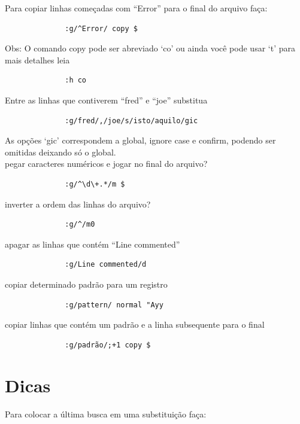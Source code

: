 \documentclass[10pt,a4paper,openany]{book}
\begin{document}
Para copiar linhas começadas com ``Error'' para o final do arquivo faça:

\begin{verbatim}
			  :g/^Error/ copy $
\end{verbatim}

Obs: O comando copy pode ser abreviado `co' ou ainda você pode usar `t'
para mais detalhes leia

\begin{verbatim}
			  :h co
\end{verbatim}

Entre as linhas que contiverem ``fred'' e ``joe'' substitua

\begin{verbatim}
			  :g/fred/,/joe/s/isto/aquilo/gic
\end{verbatim}

As opções `gic' correspondem a global, ignore case e confirm, podendo ser
omitidas deixando só o global. \\


pegar caracteres numéricos e jogar no final do arquivo?

\begin{verbatim}
			  :g/^\d\+.*/m $
\end{verbatim}

inverter a ordem das linhas do arquivo?

\begin{verbatim}
			  :g/^/m0
\end{verbatim}

apagar as linhas que contém ``Line commented''

\begin{verbatim}
			  :g/Line commented/d
\end{verbatim}

copiar determinado padrão para um registro

\begin{verbatim}
			  :g/pattern/ normal "Ayy
\end{verbatim}

copiar linhas que contém um padrão e a linha subsequente para o final

\begin{verbatim}
			  :g/padrão/;+1 copy $
\end{verbatim}

\section{Dicas }
Para colocar a última busca em uma substituição faça:
\end{document}
